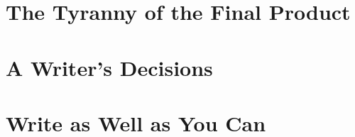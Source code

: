 \documentclass{article}
\begin{document}
\section{The Tyranny of the Final Product}


\section{A Writer's Decisions}


\section{Write as Well as You Can}


\printbibliography[heading=bibintoc]
\end{document}
